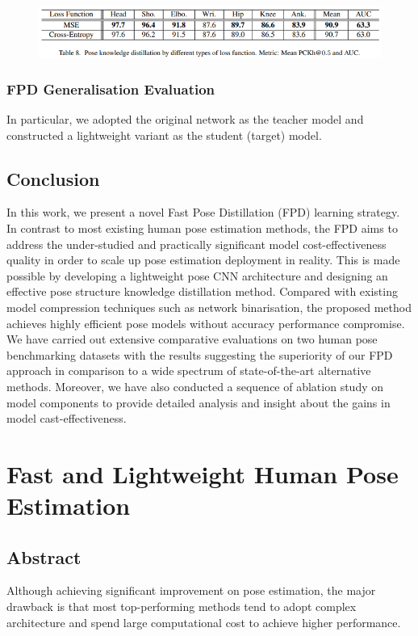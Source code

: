 \documentclass[11pt]{article}
\begin{document}
\begin{figure}[H]
	\centering
	\includegraphics[scale = 0.5]{77}
\end{figure}

\subsubsection{FPD Generalisation Evaluation}
In particular, we adopted the original network as the teacher model and constructed a lightweight variant as the student (target) model.

\subsection{Conclusion}
In this work, we present a novel Fast Pose Distillation (FPD) learning strategy. In contrast to most existing human pose estimation methods, the FPD aims to address the under-studied and practically significant model cost-effectiveness quality in order to scale up pose estimation deployment in reality. This is made possible by developing a lightweight pose CNN architecture and designing an effective pose structure knowledge distillation method. Compared with existing model compression techniques such as network binarisation, the proposed method achieves highly efficient pose models without accuracy performance compromise. We have carried out extensive comparative evaluations on two human pose benchmarking datasets with the results suggesting the superiority of our FPD approach in comparison to a wide spectrum of state-of-the-art alternative methods. Moreover, we have also conducted a sequence of ablation study on model components to provide detailed analysis and insight about the gains in model cast-effectiveness.
\section{Fast and Lightweight Human Pose Estimation}
\subsection{Abstract}
Although achieving significant improvement on pose estimation, the major drawback is that
most top-performing methods tend to adopt complex architecture and spend large computational cost to achieve higher performance.
\end{document}
